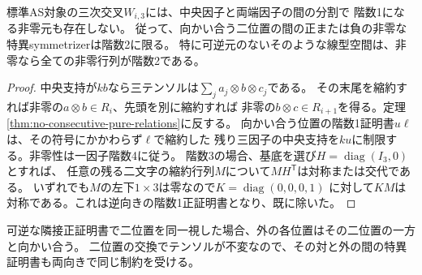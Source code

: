 \begin{corollary}\label{cor:opposite-singular-rank-two}
標準AS対象の三次交叉$W_{i,3}$には、中央因子と両端因子の間の分割で
階数1になる非零元も存在しない。
従って、向かい合う二位置の間の正または負の非零な特異symmetrizerは階数2に限る。
特に可逆元のないそのような線型空間は、非零なら全ての非零行列が階数2である。
\end{corollary}
\begin{proof}
中央支持が$kb$なら三テンソルは$\sum_j a_j\otimes b\otimes c_j$である。
その末尾を縮約すれば非零の$a\otimes b\in R_i$、先頭を別に縮約すれば
非零の$b\otimes c\in R_{i+1}$を得る。定理\ref{thm:no-consecutive-pure-relations}に反する。
向かい合う位置の階数1証明書$u\ell$は、その符号にかかわらず$\ell$で縮約した
残り三因子の中央支持を$ku$に制限する。非零性は一因子階数4に従う。
階数3の場合、基底を選び$H=\operatorname{diag}(I_3,0)$とすれば、
任意の残る二文字の縮約行列$M$について$MH^{\mathsf T}$は対称または交代である。
いずれでも$M$の左下$1\times3$は零なので$K=\operatorname{diag}(0,0,0,1)$
に対して$KM$は対称である。これは逆向きの階数1正証明書となり、既に除いた。
\end{proof}
可逆な隣接正証明書で二位置を同一視した場合、外の各位置はその二位置の一方と向かい合う。
二位置の交換でテンソルが不変なので、その対と外の間の特異証明書も両向きで同じ制約を受ける。
